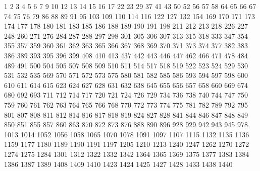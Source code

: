 1
2
3
4
5
6
7
9
10
12
13
14
15
16
17
22
23
29
37
41
43
50
52
56
57
58
64
65
66
67
74
75
76
79
86
88
89
91
95
103
109
110
114
116
122
127
132
154
169
170
171
173
174
177
178
180
181
183
185
186
188
189
190
191
198
211
212
213
218
226
227
248
260
271
276
284
287
288
297
298
301
305
306
307
313
315
318
333
347
354
355
357
359
360
361
362
363
365
366
367
368
369
370
371
373
374
377
382
383
386
389
393
395
396
399
408
410
413
437
442
443
446
447
462
466
471
478
484
489
491
500
504
505
507
508
509
510
511
514
517
518
519
522
523
524
529
530
531
532
535
569
570
571
572
573
575
580
581
582
585
586
593
594
597
598
600
610
611
614
615
623
624
627
628
631
632
638
645
655
656
657
658
660
669
674
680
692
693
711
712
714
717
720
721
724
726
729
734
736
738
740
744
747
750
759
760
761
762
763
764
765
766
768
770
772
773
774
775
781
782
789
792
795
801
807
808
811
812
814
816
817
818
819
824
827
828
841
844
846
847
848
849
850
851
855
857
860
863
870
872
873
876
888
890
896
928
929
942
943
945
978
1013
1014
1052
1056
1058
1065
1070
1078
1091
1097
1107
1115
1132
1135
1136
1159
1177
1180
1189
1190
1191
1197
1205
1210
1213
1240
1247
1262
1270
1272
1274
1275
1284
1301
1312
1322
1332
1342
1364
1365
1369
1375
1377
1383
1384
1386
1387
1389
1408
1409
1410
1423
1424
1425
1427
1428
1433
1438
1440

